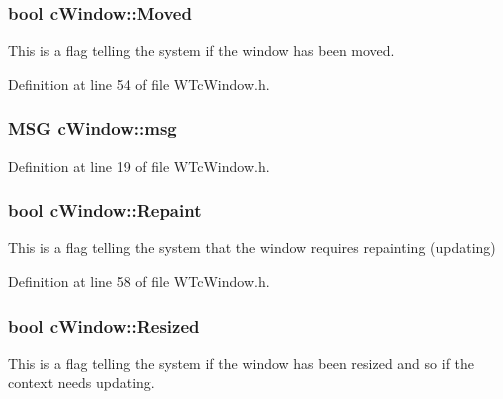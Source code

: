 \hypertarget{classc_window_a996dd0906b9bfa7686275febad69d05e}{
\subsubsection[{Moved}]{\setlength{\rightskip}{0pt plus 5cm}bool {\bf cWindow::Moved}}}
\label{classc_window_a996dd0906b9bfa7686275febad69d05e}


This is a flag telling the system if the window has been moved. 



Definition at line 54 of file WTcWindow.h.

\hypertarget{classc_window_a38385e784656f1875585e6cc4dc1fee4}{
\subsubsection[{msg}]{\setlength{\rightskip}{0pt plus 5cm}MSG {\bf cWindow::msg}}}
\label{classc_window_a38385e784656f1875585e6cc4dc1fee4}


Definition at line 19 of file WTcWindow.h.

\hypertarget{classc_window_a41a2b92f962e385d7f11f099246b4264}{
\subsubsection[{Repaint}]{\setlength{\rightskip}{0pt plus 5cm}bool {\bf cWindow::Repaint}}}
\label{classc_window_a41a2b92f962e385d7f11f099246b4264}


This is a flag telling the system that the window requires repainting (updating) 



Definition at line 58 of file WTcWindow.h.

\hypertarget{classc_window_abe671e06a64e2e044dcf7c074ba579be}{
\subsubsection[{Resized}]{\setlength{\rightskip}{0pt plus 5cm}bool {\bf cWindow::Resized}}}
\label{classc_window_abe671e06a64e2e044dcf7c074ba579be}


This is a flag telling the system if the window has been resized and so if the context needs updating. 



